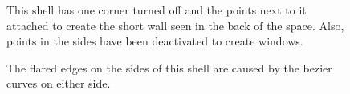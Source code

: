 \documentclass{thesis}
\begin{document}
\begin{figure}
\caption[Shell with windows]{This shell has one corner turned off and the points next to it attached to create the short wall
seen in the back of the space.  Also, points in the sides have been deactivated to create windows.}
\label{fig:bird_windows}
\end{figure}

\begin{figure}
\caption[Flared shell]{The flared edges on the sides of this shell are caused by the bezier curves on either side.}
\label{fig:thing_with_wings}
\end{figure}
\end{document}
